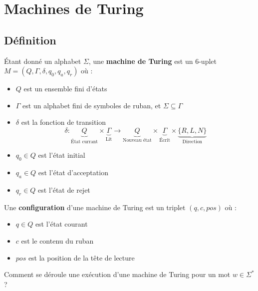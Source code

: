 
\section{Machines de Turing}

\subsection{Définition}

\begin{definition}
	Étant donné un alphabet $\Sigma$, une \textbf{machine de Turing} est un 6-uplet $M = (Q, \Gamma, \delta, q_0, q_a, q_r)$ où :
	\begin{itemize}
		\item $Q$ est un ensemble fini d'états
		\item $\Gamma$ est un alphabet fini de symboles de ruban, et $\Sigma \subseteq \Gamma$
		\item $\delta$ est la fonction de transition
		      $$ \delta: \underbrace{Q}_{\text{État currant}} \times \underbrace{\Gamma}_{\text{Lit}} \to \underbrace{Q}_{\text{Nouveau état}} \times
			      \underbrace{\Gamma}_{\text{Écrit}} \times \underbrace{\{R, L, N\}}_{\text{Direction}} $$
		\item $q_0 \in Q$ est l'état initial
		\item $q_a \in Q$ est l'état d'acceptation
		\item $q_r \in Q$ est l'état de rejet
	\end{itemize}
\end{definition}

\begin{definition}[Configuration]
	Une \textbf{configuration} d'une machine de Turing est un triplet $(q, c, pos)$ où :
	\begin{itemize}
		\item $q \in Q$ est l'état courant
		\item $c$ est le contenu du ruban
		\item $pos$ est la position de la tête de lecture
	\end{itemize}
\end{definition}

Comment se déroule une exécution d'une machine de Turing pour un mot $w \in \Sigma^*$ ?

